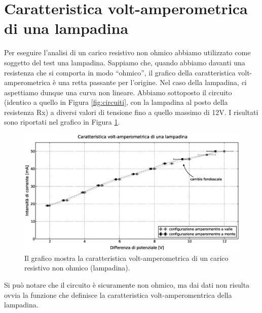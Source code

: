 \section{Caratteristica volt-amperometrica di una lampadina}
Per eseguire l'analisi di un carico resistivo non ohmico abbiamo utilizzato come soggetto del test una lampadina. Sappiamo che, quando abbiamo davanti una resistenza che si comporta in modo ``ohmico'', il grafico della caratteristica volt-amperometrica è una retta passante per l'origine. Nel caso della lampadina, ci aspettiamo dunque una curva non lineare. Abbiamo sottoposto il circuito (identico a quello in Figura \ref{fig:circuiti}, con la lampadina al posto della resistenza Rx) a diversi valori di tensione fino a quello massimo di 12V. I risultati sono riportati nel grafico in Figura \ref{fig:lampadina}.

\begin{figure}[h]
    \centering
        \includegraphics[width=\textwidth]{lamp.eps}
        \caption{Il grafico mostra la caratteristica volt-amperometrica di un carico resistivo non ohmico (lampadina).}
        \label{fig:lampadina}
\end{figure}

Si può notare che il circuito è sicuramente non ohmico, ma dai dati non risulta ovvia la funzione che definisce la caratteristica volt-amperomentrica della lampadina.